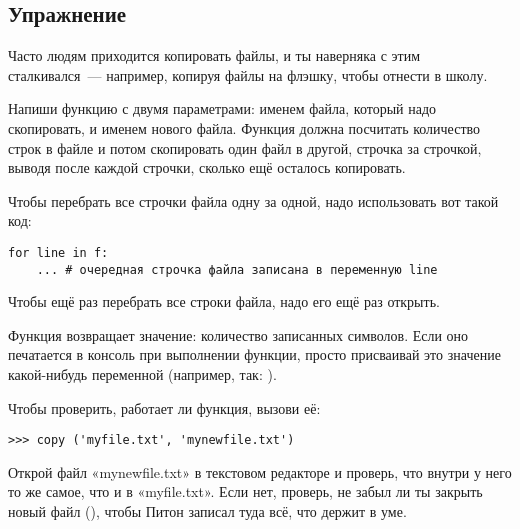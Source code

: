\subsection*{Упражнение}

Часто людям приходится копировать файлы, и ты наверняка с этим сталкивался — например, копируя файлы на флэшку, чтобы отнести в школу.

Напиши функцию  с двумя параметрами: именем файла, который надо скопировать, и именем нового файла.
Функция должна посчитать количество строк в файле и потом скопировать один файл в другой, строчка за строчкой, выводя после каждой строчки, сколько ещё осталось копировать.

Чтобы перебрать все строчки файла  одну за одной, надо использовать вот такой код:
\begin{listing}
\begin{verbatim}
for line in f:
	... # очередная строчка файла записана в переменную line
\end{verbatim}
\end{listing}

Чтобы ещё раз перебрать все строки файла, надо его ещё раз открыть.

Функция  возвращает значение: количество записанных символов. Если оно печатается в консоль при выполнении функции, просто присваивай это значение какой-нибудь переменной (например, так: ).

Чтобы проверить, работает ли функция, вызови её:

\begin{listing}
\begin{verbatim}
>>> copy ('myfile.txt', 'mynewfile.txt')

\end{verbatim}
\end{listing}

Открой файл «mynewfile.txt» в текстовом редакторе и проверь, что внутри у него то же самое, что и в «myfile.txt». Если нет, проверь, не забыл ли ты закрыть новый файл (), чтобы Питон записал туда всё, что держит в уме.

\newpage
